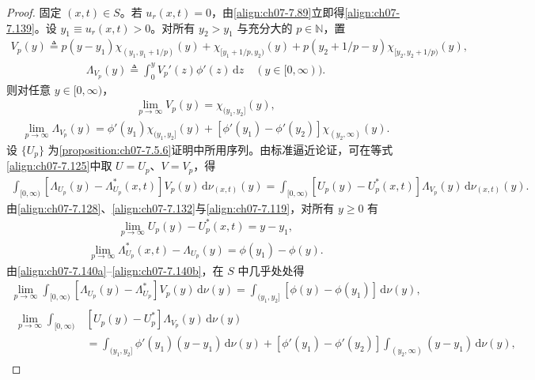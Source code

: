\documentclass[../../main.tex]{subfiles}%
\begin{document}
\begin{proof}
固定 $(x,t)\in S$。若 $u_r(x,t)=0$，由\eqref{align:ch07-7.89}立即得\eqref{align:ch07-7.139}。设 $y_1\equiv u_r(x,t)>0$。对所有 $y_2>y_1$ 与充分大的 $p\in\mathbb{N}$，置
\begin{align*}
V_p(y)\triangleq p(y-y_1)\chi_{(y_1,y_1+1/p)}(y)+\chi_{[y_1+1/p,y_2)}(y)+p(y_2+1/p-y)\chi_{[y_2,y_2+1/p)}(y),
\end{align*}
\begin{align*}
\Lambda_{V_p}(y)\triangleq \int_0^y V_p'(z)\phi'(z)\,\mathrm{d}z\quad(y\in[0,\infty)).
\end{align*}
则对任意 $y\in[0,\infty)$，
\begin{align}
\lim_{p\to\infty}V_p(y)=\chi_{(y_1,y_2]}(y), \label{align:ch07-7.140a}
\end{align}
\begin{align}
\lim_{p\to\infty}\Lambda_{V_p}(y)=\phi'(y_1)\chi_{(y_1,y_2]}(y)+[\phi'(y_1)-\phi'(y_2)]\chi_{(y_2,\infty)}(y). \label{align:ch07-7.140b}
\end{align}
设 $\{U_p\}$ 为\cref{proposition:ch07-7.5.6}证明中所用序列。由标准逼近论证，可在等式\eqref{align:ch07-7.125}中取 $U=U_p$、$V=V_p$，得
\begin{align*}
\int_{[0,\infty)}[\Lambda_{U_p}(y)-\Lambda_{U_p}^*(x,t)]V_p(y)\,\mathrm{d}\nu_{(x,t)}(y)
=\int_{[0,\infty)}[U_p(y)-U_p^*(x,t)]\Lambda_{V_p}(y)\,\mathrm{d}\nu_{(x,t)}(y).
\end{align*}
由\eqref{align:ch07-7.128}、\eqref{align:ch07-7.132}与\eqref{align:ch07-7.119}，对所有 $y\geqslant0$ 有
\begin{align*}
\lim_{p\to\infty}U_p(y)-U_p^*(x,t)=y-y_1,
\end{align*}
\begin{align*}
\lim_{p\to\infty}\Lambda_{U_p}^*(x,t)-\Lambda_{U_p}(y)=\phi(y_1)-\phi(y).
\end{align*}
由\eqref{align:ch07-7.140a}--\eqref{align:ch07-7.140b}，在 $S$ 中几乎处处得
\begin{align*}
\lim_{p\to\infty}\int_{[0,\infty)}[\Lambda_{U_p}(y)-\Lambda_{U_p}^*]V_p(y)\,\mathrm{d}\nu(y)
=\int_{(y_1,y_2]}[\phi(y)-\phi(y_1)]\,\mathrm{d}\nu(y),
\end{align*}
\begin{align*}
\begin{aligned}
\lim_{p\to\infty}\int_{[0,\infty)}&[U_p(y)-U_p^*]\Lambda_{V_p}(y)\,\mathrm{d}\nu(y)\\
&=\int_{(y_1,y_2]}\phi'(y_1)(y-y_1)\,\mathrm{d}\nu(y)
+[\phi'(y_1)-\phi'(y_2)]\int_{(y_2,\infty)}(y-y_1)\,\mathrm{d}\nu(y),

\end{aligned}
\end{align*}
\end{proof}
\end{document}
